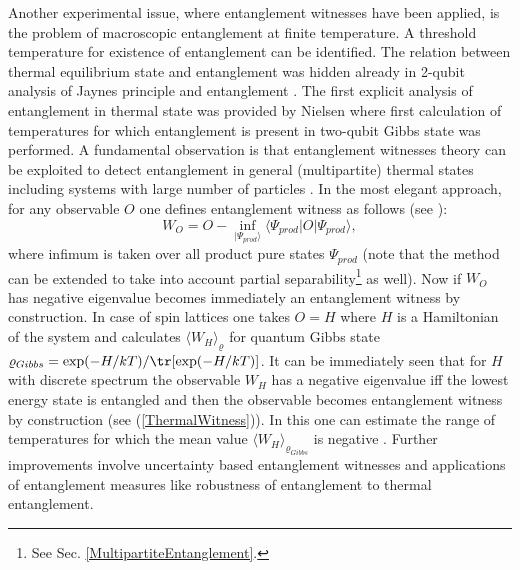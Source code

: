 \documentclass[twocolumn,aps,rmp]{revtex4}
\begin{document}
Another experimental issue, where entanglement witnesses have been
applied, is the problem of macroscopic entanglement at finite
temperature. A threshold temperature for existence of entanglement can
be identified. The relation between thermal equilibrium state and
entanglement was hidden already in 2-qubit analysis of Jaynes
principle and entanglement \cite{Jaynes}. The first explicit analysis
of entanglement in thermal state was provided by Nielsen
\cite{NielsenPhD} where first calculation of temperatures for which
entanglement is present in two-qubit Gibbs state was performed. A
fundamental observation is that entanglement witnesses theory can be
exploited to detect entanglement in general (multipartite) thermal
states including systems with large number of particles
\cite{BrucknerVedralTemperature,TothTemperature}. In the most elegant
approach, for any observable $O$ one defines entanglement witness as
follows (see \cite{TothTemperature}):
\begin{equation}
W_{O}=O-\inf_{|\Psi_{prod}\rangle} \langle
\Psi_{prod}|O|\Psi_{prod}\rangle, \label{ThermalWitness}
\end{equation}
where infimum is taken over all product pure states $\Psi_{prod}$
(note that the method can be extended to take into account partial
separability\footnote{See Sec.  \ref{MultipartiteEntanglement}.} as
well). Now if $W_{O}$ has negative eigenvalue becomes immediately an
entanglement witness by construction. In case of spin lattices one
takes $O=H$ where $H$ is a Hamiltonian of the system and calculates
$\langle W_{H}\rangle_{\varrho}$ for quantum Gibbs state
$\varrho_{Gibbs}=\exp(-H/kT)/{\tr}[\exp(-H/kT)]$. It can be
immediately seen that for $H$ with discrete spectrum the observable
$W_{H}$ has a negative eigenvalue iff the lowest energy state is
entangled and then the observable becomes entanglement witness by
construction (see (\ref{ThermalWitness})). In this one can estimate
the range of temperatures for which the mean value $\langle
W_{H}\rangle_{\varrho_{Gibbs}}$ is negative \cite{TothTemperature}.
Further improvements involve uncertainty based entanglement witnesses
\cite{AndersVedralTemperature} and applications of entanglement
measures like robustness of entanglement
\cite{MarkhamVedralTemperature} to thermal entanglement.
\end{document}
